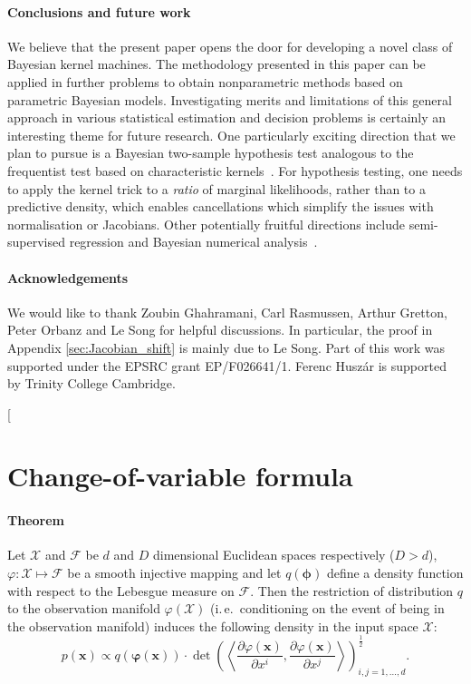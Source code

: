 \documentclass[twoside]{article}
\newcommand{\ie}{i.\,e.\ }
\begin{document}
\paragraph{Conclusions and future work} We believe that the present paper opens the door for developing a novel class of Bayesian kernel machines. The methodology presented in this paper can be applied in further problems to obtain nonparametric methods based on parametric Bayesian models. Investigating merits and limitations of this general approach in various statistical estimation and decision problems is certainly an interesting theme for future research. One particularly exciting direction that we plan to pursue is a Bayesian two-sample hypothesis test analogous to the frequentist test based on characteristic kernels~\cite{Sriperumbudur2008}. For hypothesis testing, one needs to apply the kernel trick to a \emph{ratio} of marginal likelihoods, rather than to a predictive density, which enables cancellations which simplify the issues with normalisation or Jacobians. Other potentially fruitful directions include semi-supervised regression and Bayesian numerical analysis~\cite{OHagan1992}.

\paragraph{Acknowledgements} We would like to thank Zoubin Ghahramani, Carl Rasmussen, Arthur Gretton, Peter Orbanz
and Le Song for helpful discussions. In particular, the proof in
Appendix \ref{sec:Jacobian_shift} is mainly due to Le Song. Part of this work was supported
under the EPSRC grant EP/F026641/1. Ferenc Husz\'{a}r is supported by Trinity College Cambridge.




\appendix

\twocolumn[
\section{Change-of-variable formula\label{sec:change_of_variable}}

\paragraph{Theorem} Let $\mathcal{X}$ and $\mathcal{F}$ be $d$ and $D$ dimensional Euclidean spaces respectively ($D>d$), ${\varphi:\mathcal{X} \mapsto \mathcal{F}}$ be a smooth injective mapping and let $q(\bm{\phi})$ define a density function with respect to the Lebesgue measure on $\mathcal{F}$. Then the restriction of distribution $q$ to the observation manifold $\varphi(\mathcal{X})$ (\ie conditioning on the event of being in the observation manifold) induces the following density in the input space $\mathcal{X}$:
\begin{equation} \label{eq:densityChange}
p(\bm{x}) \propto q(\bm{\varphi}(\bm{x})) \cdot \det\left( \left\langle\frac{\partial\varphi(\bm{x})}{\partial x^i} ,  \frac{\partial\varphi(\bm{x})}{\partial x^j}\right\rangle \right)^{\frac{1}{2}}_{i,j=1,\ldots, d}\mbox{.}
\end{equation}
\end{document}
